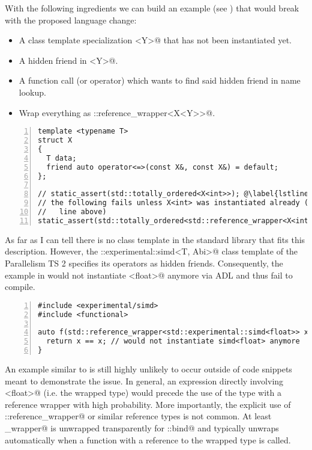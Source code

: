 With the following ingredients we can build an example (see ) that 
would break with the proposed language change:
\begin{itemize}
\item A class template specialization \codelst@X<Y>@ that has not been instantiated yet.
\item A hidden friend in \codelst@X<Y>@.
\item A function call (or operator) which wants to find said hidden friend in name lookup.
\item Wrap everything as \codelst@std::reference_wrapper<X<Y>>@.
\end{itemize}
\begin{lstlisting}[numbers=left,float={hbtp},label=lst:refwrapperproblem,caption={
\code{std::reference_wrapper} example which would fail unless 
line~\ref{lstline:refwrapperproblem0} is uncommented
}]
template <typename T>
struct X
{
  T data;
  friend auto operator<=>(const X&, const X&) = default;
};

// static_assert(std::totally_ordered<X<int>>); @\label{lstline:refwrapperproblem0}@
// the following fails unless X<int> was instantiated already (e.g. with the
//   line above)
static_assert(std::totally_ordered<std::reference_wrapper<X<int>>>);
\end{lstlisting}

As far as I can tell there is no class template in the standard library that fits this 
description. However, the \codelst@std::experimental::simd<T, Abi>@ class template of the 
Parallelism TS 2 specifies its operators as hidden friends. Consequently, the example in 
 would not instantiate \codelst@simd<float>@ anymore via ADL and thus 
fail to compile.
\begin{lstlisting}[numbers=left,float={hbtp},label=lst:refwrappersimd,caption={
Regression when combining \code{std::reference_wrapper} with 
\code{std::experimental::simd}.
}]
#include <experimental/simd>
#include <functional>

auto f(std::reference_wrapper<std::experimental::simd<float>> x) {
  return x == x; // would not instantiate simd<float> anymore
}
\end{lstlisting}

An example similar to  is still highly unlikely to occur outside of 
code snippets meant to demonstrate the issue. In general, an expression directly involving 
\codelst@simd<float>@ (i.e. the wrapped type) would precede the use of the type with a 
reference wrapper with high probability.
More importantly, the explicit use of \codelst@std::reference_wrapper@ or similar 
reference types is not common. At least \codelst@reference_wrapper@ is unwrapped 
transparently for \codelst@std::bind@ and typically unwraps automatically when a function 
with a reference to the wrapped type is called.

